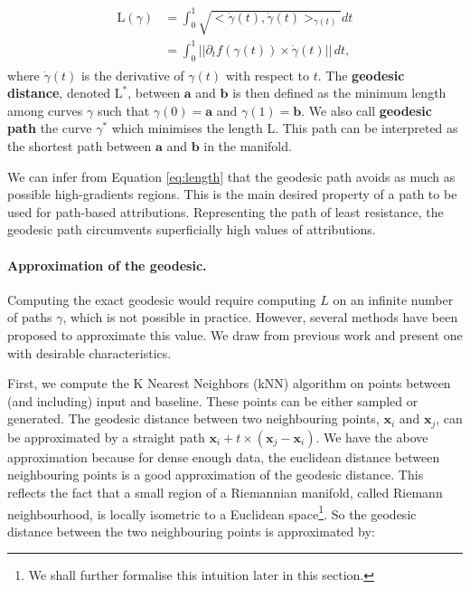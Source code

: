 \begin{align}
\begin{split}
    \textrm{L}(\gamma) &= \int_0^1 \sqrt{<\dot \gamma(t), \dot \gamma(t)>_{\gamma(t)}}dt \\
    &= \int_0^1 ||\partial_t f(\gamma(t)) \times \dot\gamma(t)|| \, dt,
\end{split}
\label{eq:length}
\end{align}
where $\dot\gamma(t)$ is the derivative of $\gamma(t)$ with respect to $t$.
The \textbf{geodesic distance}, denoted $\textrm{L}^*$, between $\textbf{a}$ and $\textbf{b}$ is then defined as the minimum length among curves $\gamma$ such that $\gamma(0) = \textbf{a}$ and $\gamma(1) = \textbf{b}$. We also call \textbf{geodesic path} the curve $\gamma^*$ which minimises the length L. This path can be interpreted as the shortest path between $\textbf{a}$ and $\textbf{b}$ in the manifold. 

\begin{remark}
We can infer from Equation \ref{eq:length} that the geodesic path avoids as much as possible high-gradients regions. This is the main desired property of a path to be used for path-based attributions. Representing the path of least resistance, the geodesic path circumvents superficially high values of attributions.
\end{remark}

\paragraph{Approximation of the geodesic.} Computing the exact geodesic would require computing $L$ on an infinite number of paths $\gamma$, which is not possible in practice. However, several methods have been proposed to approximate this value. We draw from previous work \citep{yang2018geodesic, chen2019fast} and present one with desirable characteristics.

First, we compute the K Nearest Neighbors (kNN) algorithm on points between (and including) input and baseline. These points can be either sampled or generated. The geodesic distance between two neighbouring points, $\textbf{x}_i$ and $\textbf{x}_j$, can be approximated by a straight path $\textbf{x}_i + t \times (\textbf{x}_j - \textbf{x}_i)$. We have the above approximation because for dense enough data, the euclidean distance between neighbouring points is a good approximation of the geodesic distance. This reflects the fact that a small region of a Riemannian manifold, called Riemann neighbourhood, is locally isometric to a Euclidean space\footnote{We shall further formalise this intuition later in this section.}. So the geodesic distance between the two neighbouring points is approximated by: 

